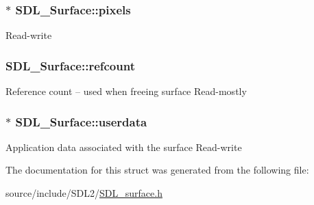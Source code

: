 \subsubsection[{pixels}]{$\ast$ S\+D\+L\+\_\+\+Surface\+::pixels}\label{struct_s_d_l___surface_abd9597e0e084b8ef33fe0397bc26d911}
Read-\/write \hypertarget{struct_s_d_l___surface_a03d10628a359c0674f5ceffd574f1641}{}
\subsubsection[{refcount}]{ S\+D\+L\+\_\+\+Surface\+::refcount}\label{struct_s_d_l___surface_a03d10628a359c0674f5ceffd574f1641}
Reference count -- used when freeing surface Read-\/mostly \hypertarget{struct_s_d_l___surface_ae66d973dcb9b57cb34815892e1ee1f31}{}
\subsubsection[{userdata}]{$\ast$ S\+D\+L\+\_\+\+Surface\+::userdata}\label{struct_s_d_l___surface_ae66d973dcb9b57cb34815892e1ee1f31}
Application data associated with the surface Read-\/write 

The documentation for this struct was generated from the following file\+:\begin{DoxyCompactItemize}
\item 
source/include/\+S\+D\+L2/\hyperlink{_s_d_l__surface_8h}{S\+D\+L\+\_\+surface.\+h}\end{DoxyCompactItemize}
